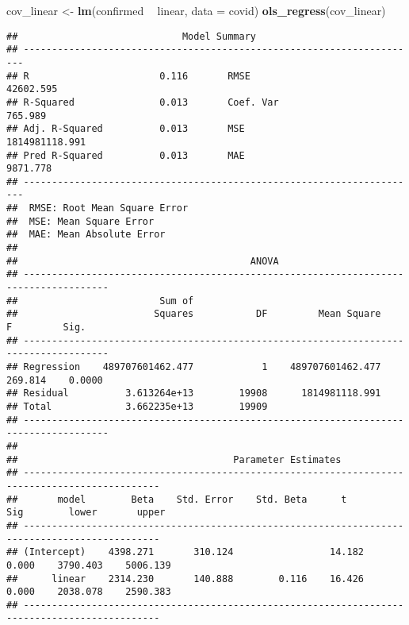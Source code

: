 \documentclass[]{article}
\newenvironment{Shaded}{\begin{snugshade}}{\end{snugshade}}
\newcommand{\KeywordTok}[1]{\textcolor[rgb]{0.13,0.29,0.53}{\textbf{#1}}}
\newcommand{\DataTypeTok}[1]{\textcolor[rgb]{0.13,0.29,0.53}{#1}}
\newcommand{\StringTok}[1]{\textcolor[rgb]{0.31,0.60,0.02}{#1}}
\newcommand{\OperatorTok}[1]{\textcolor[rgb]{0.81,0.36,0.00}{\textbf{#1}}}
\newcommand{\NormalTok}[1]{#1}
\begin{document}
\begin{Shaded}
\begin{Highlighting}[]
\NormalTok{cov_linear <-}\StringTok{ }\KeywordTok{lm}\NormalTok{(confirmed }\OperatorTok{~}\StringTok{ }\NormalTok{linear, }\DataTypeTok{data =}\NormalTok{ covid)}
\KeywordTok{ols_regress}\NormalTok{(cov_linear)}
\end{Highlighting}
\end{Shaded}

\begin{verbatim}
##                             Model Summary                              
## ----------------------------------------------------------------------
## R                       0.116       RMSE                    42602.595 
## R-Squared               0.013       Coef. Var                 765.989 
## Adj. R-Squared          0.013       MSE                1814981118.991 
## Pred R-Squared          0.013       MAE                      9871.778 
## ----------------------------------------------------------------------
##  RMSE: Root Mean Square Error 
##  MSE: Mean Square Error 
##  MAE: Mean Absolute Error 
## 
##                                         ANOVA                                         
## -------------------------------------------------------------------------------------
##                         Sum of                                                       
##                        Squares           DF         Mean Square       F         Sig. 
## -------------------------------------------------------------------------------------
## Regression    489707601462.477            1    489707601462.477    269.814    0.0000 
## Residual          3.613264e+13        19908      1814981118.991                      
## Total             3.662235e+13        19909                                          
## -------------------------------------------------------------------------------------
## 
##                                      Parameter Estimates                                       
## ----------------------------------------------------------------------------------------------
##       model        Beta    Std. Error    Std. Beta      t        Sig        lower       upper 
## ----------------------------------------------------------------------------------------------
## (Intercept)    4398.271       310.124                 14.182    0.000    3790.403    5006.139 
##      linear    2314.230       140.888        0.116    16.426    0.000    2038.078    2590.383 
## ----------------------------------------------------------------------------------------------
\end{verbatim}
\end{document}
